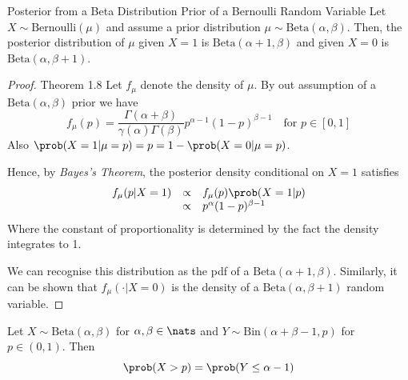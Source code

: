 \documentclass[11pt,a4paper]{article}
\begin{document}
\begin{theorem}{Posterior from a Beta Distribution Prior of a Bernoulli Random Variable}
  Let $X\sim\text{Bernoulli}(\mu)$ and assume a prior distribution $\mu\sim\text{Beta}(\alpha,\beta)$. Then, the posterior distribution of $\mu$ given $X=1$ is $\text{Beta}(\alpha+1,\beta)$ and given $X=0$ is $\text{Beta}(\alpha,\beta+1)$.
\end{theorem}

\begin{proof}{Theorem 1.8}
  Let $f_\mu$ denote the density of $\mu$. By out assumption of a $\text{Beta}(\alpha,\beta)$ prior we have
  \[ f_\mu(p)=\frac{\Gamma(\alpha+\beta)}{\gamma(\alpha)\Gamma(\beta)}p^{\alpha-1}(1-p)^{\beta-1}\quad\text{for }p\in[0,1] \]
  Also $\prob(X=1|\mu=p)=p=1-\prob(X=0|\mu=p)$.
  \par Hence, by \textit{Bayes's Theorem}, the posterior density conditional on $X=1$ satisfies
  \[\begin{array}{rcl}
  f_\mu(p|X=1)&\propto&f_\mu(p)\prob(X=1|p)\\
  &\propto&p^\alpha(1-p)^{\beta-1}
  \end{array}\]
  Where the constant of proportionality is determined by the fact the density integrates to 1.
  \par We can recognise this distribution as the pdf of a $\text{Beta}(\alpha+1,\beta)$. Similarly, it can be shown that $f_\mu(\cdot|X=0)$ is the density of a $\text{Beta}(\alpha,\beta+1)$ random variable.
  \hfill\proved
\end{proof}

\begin{theorem}{}
  Let $X\sim\text{Beta}(\alpha,\beta)$ for $\alpha,\beta\in\nats$ and $Y\sim\text{Bin}(\alpha+\beta-1,p)$ for $p\in(0,1)$. Then
  \[ \prob(X>p)=\prob(Y\leq\alpha-1) \]
\end{theorem}
\end{document}
